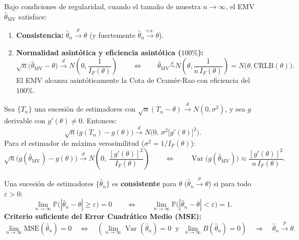 \documentclass[10pt,a4paper]{article}
\newcommand{\Prob}{\mathbb{P}}
\newcommand{\Var}{\operatorname{Var}}
\newcommand{\adist}{\overset{a}{\sim}}
\newcommand{\dto}{\xrightarrow{\;d\;}}
\newcommand{\pto}{\xrightarrow{\;p\;}}
\newcommand{\dcs}{\xrightarrow{\mathrm{c.s.}}}
\begin{document}
\begin{thmbox}[frametitle={Propiedades Asintóticas del EMV y Normalidad Límite}]
Bajo condiciones de regularidad, cuando el tamaño de muestra $n \to \infty$, el EMV $\hat\theta_{\text{MV}}$ satisface:
\begin{enumerate}
  \item \textbf{Consistencia:} $\hat\theta_n \pto \theta$ (y fuertemente $\hat\theta_n \dcs \theta$).
  \item \textbf{Normalidad asintótica y eficiencia asintótica ($100\%$):}
  \[
  \sqrt{n}\big(\hat\theta_{\text{MV}} - \theta\big) \dto N\left(0, \frac{1}{I_F(\theta)}\right)
  \qquad\Longleftrightarrow\qquad
  \hat\theta_{\text{MV}} \adist N\left(\theta, \frac{1}{n\,I_F(\theta)}\right) = N\big(\theta, \text{CRLB}(\theta)\big).
  \]
  El EMV alcanza asintóticamente la Cota de Cramér-Rao con eficiencia del $100\%$.
\end{enumerate}
\end{thmbox}

\begin{thmbox}[frametitle={Método Delta (Aproximación de transformaciones 1D)}]
Sea $\{T_n\}$ una sucesión de estimadores con $\sqrt{n}(T_n - \theta) \dto N(0, \sigma^2)$, y sea $g$ derivable con $g'(\theta) \ne 0$. Entonces:
\[
\sqrt{n}\big(g(T_n) - g(\theta)\big) \dto N\Big(0,\, \sigma^2 \big[g'(\theta)]^2\Big).
\]
Para el estimador de máxima verosimilitud ($\sigma^2 = 1/I_F(\theta)$):
\[
\sqrt{n}\Big(g(\hat\theta_{\text{MV}}) - g(\theta)\Big) \dto N\left(0,\, \frac{[g'(\theta)]^2}{I_F(\theta)}\right)
\qquad\Longleftrightarrow\qquad
\Var\big(g(\hat\theta_{\text{MV}})\big) \approx \frac{[g'(\theta)]^2}{n\,I_F(\theta)}.
\]
\end{thmbox}

\begin{defbox}[frametitle={Consistencia y Convergencia en Probabilidad}]
Una sucesión de estimadores $\{\hat\theta_n\}$ es \textbf{consistente} para $\theta$ ($\hat\theta_n \pto \theta$) si para todo $\varepsilon > 0$:
\[
\lim_{n\to\infty} \Prob\big(|\hat\theta_n - \theta| \ge \varepsilon\big) = 0
\qquad\Longleftrightarrow\qquad
\lim_{n\to\infty} \Prob\big(|\hat\theta_n - \theta| < \varepsilon\big) = 1.
\]
\textbf{Criterio suficiente del Error Cuadrático Medio (MSE):}
\[
\lim_{n\to\infty} \text{MSE}(\hat\theta_n) = 0 \quad\Longleftrightarrow\quad \left(\lim_{n\to\infty}\Var(\hat\theta_n) = 0 \ \text{ y }\ \lim_{n\to\infty} B(\hat\theta_n) = 0\right) \quad\Longrightarrow\quad \hat\theta_n \pto \theta .
\]
\end{defbox}
\end{document}
